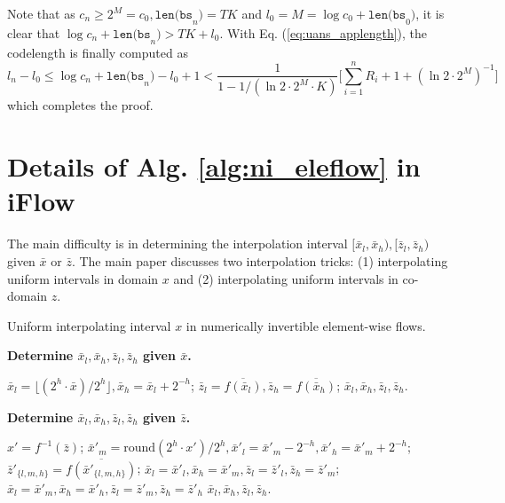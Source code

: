 \documentclass{article}
\newcommand{\quant}[1]{\bar{#1}}
\begin{document}
Note that as $c_n \ge 2^M = c_0, \texttt{len(bs}_{n}\texttt{)} = TK$ and $l_0 = M = \log c_{0} + \texttt{len(bs}_{0}\texttt{)}$, it is clear that $\log c_{n} + \texttt{len(bs}_{n}\texttt{)} > TK + l_0$. With Eq. (\ref{eq:uans_applength}), the codelength is finally computed as 
\begin{equation}
    l_n - l_0 \le \log c_{n} + \texttt{len(bs}_{n}\texttt{)} - l_0 + 1 < \frac{1}{1 - 1/(\ln 2 \cdot 2^M \cdot K)} \big[\sum_{i=1}^n R_i + 1 + (\ln 2 \cdot 2^M)^{-1} \big]
\end{equation}
which completes the proof.

\section{Details of Alg. \ref{alg:ni_eleflow} in iFlow}

The main difficulty is in determining the interpolation interval $[\quant{x}_l, \quant{x}_h), [\quant{z}_l, \quant{z}_h)$ given $\quant{x}$ or $\quant{z}$. The main paper discusses two interpolation tricks: (1) interpolating uniform intervals in domain $x$ and (2) interpolating uniform intervals in co-domain $z$.

\begin{algorithm}[ht]
\small
\caption{Uniform interpolating interval $x$ in numerically invertible element-wise flows.}
\begin{multicols}{2} 
\textbf{Determine $\quant{x}_l, \quant{x}_h, \quant{z}_l, \quant{z}_h$ given $\quant{x}$.} 

\begin{algorithmic}[1]
\STATE $\quant{x}_l = \lfloor (2^h \cdot \quant{x}) / 2^h \rfloor, \quant{x}_h = \quant{x}_l + 2^{-h}$;
\STATE $\quant{z}_l = \overline{f(\quant{x}_l)}, \quant{z}_h = \overline{f(\quant{x}_h)}$;
\RETURN $\quant{x}_l, \quant{x}_h, \quant{z}_l, \quant{z}_h$.
\end{algorithmic}

\vspace{8pt}
\textbf{Determine $\quant{x}_l, \quant{x}_h, \quant{z}_l, \quant{z}_h$ given $\quant{z}$.} 

\begin{algorithmic}[1]
\STATE $x' = f^{-1} (\quant{z})$; 
\STATE $\quant{x}'_m = \mathrm{round}(2^h \cdot x') / 2^h, \quant{x}'_l = \quant{x}'_m - 2^{-h}, \quant{x}'_h = \quant{x}'_m + 2^{-h}$;
\STATE $\quant{z}'_{\{l,m,h\}} = \overline{f(\quant{x}'_{\{l,m,h\}})}$;
\IF {$\quant{z} < \quant{z}'_m$}
\STATE $\quant{x}_l =  \quant{x}'_l, \quant{x}_h = \quant{x}'_m, \quant{z}_l =  \quant{z}'_l, \quant{z}_h = \quant{z}'_m$;
\ELSE
\STATE $\quant{x}_l = \quant{x}'_m, \quant{x}_h = \quant{x}'_h, \quant{z}_l = \quant{z}'_m, \quant{z}_h = \quant{z}'_h$
\ENDIF
\RETURN $\quant{x}_l, \quant{x}_h, \quant{z}_l, \quant{z}_h$.
\end{algorithmic}
\end{multicols}
\vspace{-8pt}
\label{alg:ni_ele_x}
\end{algorithm}
\end{document}
